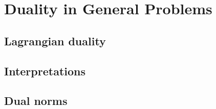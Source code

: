 \chapter{Duality in General Problems}
\label{chap:duality_general}

\section{Lagrangian duality}
\label{sec:lagrangian_duality}

\section{Interpretations}
\label{sec:duality_interpretations}

\section{Dual norms}
\label{sec:dual_norms}


